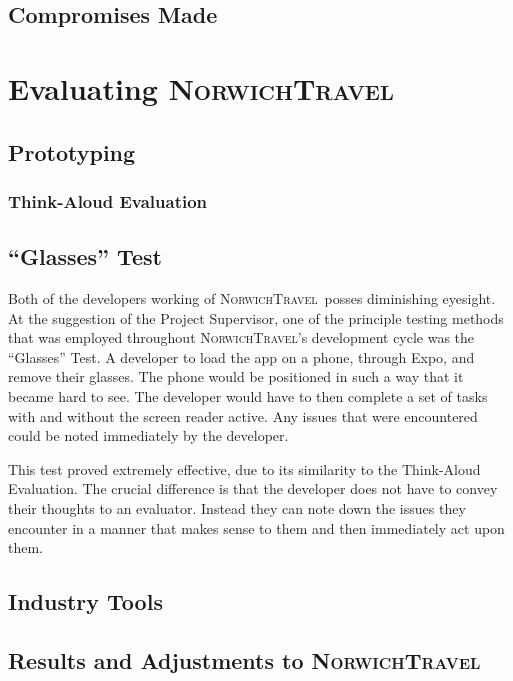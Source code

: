 \documentclass[cmpstyle]{ueacmpstyle}
\newcommand{\nt}{\textsc{NorwichTravel}}
\begin{document}
		\subsection{Compromises Made} \label{sec:comp}
	\section{Evaluating \nt} \label{sec:eval}
	
		\subsection{Prototyping} \label{sec:proto}
		
			\subsubsection{Think-Aloud Evaluation} \label{sec:think}
			
		\subsection{``Glasses'' Test} \label{sec:glasses}
		Both of the developers working of \nt \ posses diminishing eyesight. At the suggestion of the Project Supervisor, one of the principle testing methods that was employed throughout \nt's development cycle was the ``Glasses'' Test. A developer to load the app on a phone, through Expo, and remove their glasses. The phone would be positioned in such a way that it became hard to see. The developer would have to then complete a set of tasks with and without the screen reader active. Any issues that were encountered could be noted immediately by the developer. 
		
		This test proved extremely effective, due to its similarity to the Think-Aloud Evaluation. The crucial difference is that the developer does not have to convey their thoughts to an evaluator. Instead they can note down the issues they encounter in a manner that makes sense to them and then immediately act upon them. 
		
		\subsection{Industry Tools} \label{sec:industry-tools}
		
		\subsection{Results and Adjustments to \nt} \label{sec:adjust}
			
\end{document}
